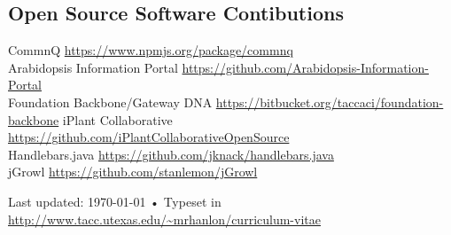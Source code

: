 \documentclass[10pt, a4paper]{article}
\begin{document}
\subsection*{Open Source Software Contibutions}
CommnQ \href{https://www.npmjs.org/package/commnq}{https://www.npmjs.org/package/commnq}\\
Arabidopsis Information Portal \href{https://github.com/Arabidopsis-Information-Portal}{https://github.com/Arabidopsis-Information-Portal}\\
Foundation Backbone/Gateway DNA \href{https://bitbucket.org/taccaci/foundation-backbone}{https://bitbucket.org/taccaci/foundation-backbone}
iPlant Collaborative \href{https://github.com/iPlantCollaborativeOpenSource}{https://github.com/iPlantCollaborativeOpenSource}\\
Handlebars.java \href{https://github.com/jknack/handlebars.java}{https://github.com/jknack/handlebars.java}\\
jGrowl \href{https://github.com/stanlemon/jGrowl}{https://github.com/stanlemon/jGrowl}



\vfill{}

\begin{center}
{\scriptsize  Last updated: \today\- •\-
Typeset in \href{http://nitens.org/taraborelli/cvtex}{
\XeTeX }\\
\href{http://www.tacc.utexas.edu/~mrhanlon/curriculum-vitae}{http://www.tacc.utexas.edu/\textasciitilde{}mrhanlon/curriculum-vitae}}
\end{center}
\end{document}
